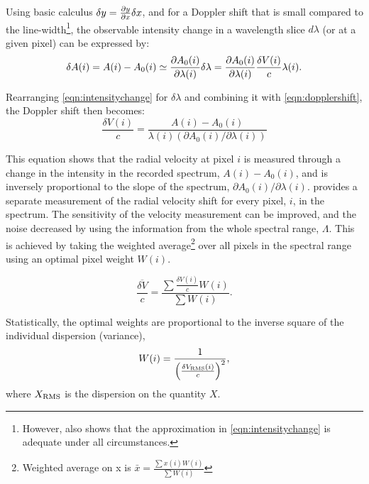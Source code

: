 
Using basic calculus \(\delta y = \frac{\partial{y}}{\partial{x}} \delta x \nonumber\), and for a Doppler shift that is small compared to the line-width\footnote{However,\citet{connes_absolute_1985} also shows that the approximation in \cref{eqn:intensitychange} is adequate under all circumstances.}, the observable intensity change in a wavelength slice \(d \lambda\) (or at a given pixel) can be expressed by:
\begin{equation}
\delta A(i) = A(i) - {A}_{0}(i) \simeq \frac{\partial{{A}_{0}(i)}}{\partial{\lambda(i)}} \delta \lambda = \frac{\partial{{A}_{0}(i)}}{\partial{\lambda(i)}} \frac{\delta V(i)}{c}\lambda(i).
\label{eqn:intensitychange}
\end{equation}

Rearranging \cref{eqn:intensitychange} for \(\delta \lambda\) and combining it with \cref{eqn:dopplershift}, the Doppler shift then becomes:
\begin{equation}
\frac{\delta V(i)}{c} = \frac{A(i) - {A}_{0}(i) }{\lambda(i) (\partial {A}_{0}(i)/\partial \lambda(i))} \label{eqn:delta_v_i}
\end{equation}

This equation shows that the radial velocity at pixel {\(i\)} is measured through a change in the intensity in the recorded spectrum, \(A(i)-{A}_{0}(i)\), and is inversely proportional to the slope of the spectrum, \({\partial {A}_{0}(i)}/{\partial \lambda(i)}\).
 provides a separate measurement of the radial velocity shift for every pixel, \(i\), in the spectrum.
The sensitivity of the velocity measurement can be improved, and the noise decreased by using the information from the whole spectral range, \(\Lambda\).
This is achieved by taking the weighted average\footnote{Weighted average on x is \(\bar{x} = \frac{\sum{ x(i)W(i)}}{\sum {W(i)}}\)} over all pixels in the spectral range using an optimal pixel weight \(W(i)\).

\begin{equation}
\overline{\frac{\delta V}{c}} = \frac{\sum{\frac{\delta V(i)}{c}W(i)}}{\sum {W(i)}}.
\end{equation}

Statistically, the optimal weights are proportional to the inverse square of the individual dispersion (variance),
\begin{equation}
W(i) = \frac{1}{{\left(\frac{\delta V_{\textrm{RMS}}(i)}{c}\right)}^{2}}, \label{eqn:weights}
\end{equation}
where \(X_{\textrm{RMS}}\) is the dispersion on the quantity \(X\).

